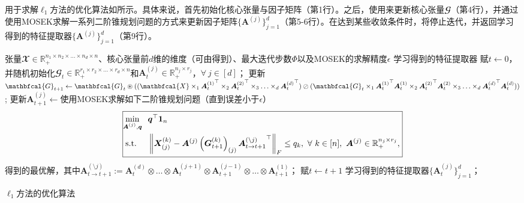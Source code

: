 用于求解$\ell_1$方法的优化算法如所示。具体来说，首先初始化核心张量与因子矩阵（第1行）。之后，使用来更新核心张量$\mathbfcal{G}$（第4行），并通过使用MOSEK求解一系列二阶锥规划问题的方式来更新因子矩阵$\{\boldsymbol{A}^{(j)}\}_{j=1}^{d}$（第5-6行）。在达到某些收敛条件时，将停止迭代，并返回学习得到的特征提取器$\{\boldsymbol{A}^{(j)}\}_{j=1}^{d}$（第9行）。

\begin{algorithm}[t]
	\begin{algorithmic}[1]
	\REQUIRE 张量$\mathbfcal{X} \in \mathbb{R}_{+}^{n_1 \times n_2 \times \ldots \times n_d \times n}$、核心张量前$d$维的维度（可由得到）、最大迭代步数$\Phi$以及MOSEK的求解精度$\epsilon$
	\ENSURE 学习得到的特征提取器
	\STATE 赋$t\leftarrow 0$，并随机初始化$\mathbfcal{G}_{t} \in \mathbb{R}_{+}^{r_1 \times r_2 \times \ldots \times r_d \times n}$和$\boldsymbol{A}^{(j)}_{t}\in \mathbb{R}_{+}^{n_j \times r_j}$，$\forall~ j\in[d]$；\hspace{-2em}
    \STATE 更新$\mathbfcal{G}_{t+1} \leftarrow \mathbfcal{G}_{t} \oast ((\mathbfcal{X} \times_{1} {\boldsymbol{A}_{t}^{(1)}}^{\top} \times_{2} {\boldsymbol{A}_{t}^{(2)}}^{\top} \times_{3} \ldots \times_{d} {\boldsymbol{A}_{t}^{(d)}}^{\top})\oslash
	(\mathbfcal{G}_{t} \times_{1} {\boldsymbol{A}_{t}^{(1)}}^{\top} \boldsymbol{A}_{t}^{(1)} \times_{2} {\boldsymbol{A}_{t}^{(2)}}^{\top} \boldsymbol{A}_{t}^{(2)} \times_{3}  \ldots \times_{d} {\boldsymbol{A}_{t}^{(d)}}^{\top} \boldsymbol{A}_{t}^{(d)}))$;
    \STATE 更新$\boldsymbol{A}_{t+1}^{(j)}\leftarrow$使用MOSEK求解如下二阶锥规划问题（直到误差小于$\epsilon$）
    \begin{equation*}
    \boxed{
        \begin{aligned}
        &\underset{\mathclap{\boldsymbol{A}^{(j)},\boldsymbol{q}}}{\min} && \boldsymbol{q}^{\top}\boldsymbol{1}_{n} \\
        &\text{s.t.} && \left\|\boldsymbol{X}^{(k)}_{(j)}- \boldsymbol{A}^{(j)} \left(\boldsymbol{G}_{t+1}^{(k)}\right)_{(j)} {\boldsymbol{A}_{t\rightarrow t+1}^{(\setminus j)}}^{\top}\right\|_{F} \leq q_{k},~\forall~ k\in[n],~\boldsymbol{A}^{(j)} \in \mathbb{R}_{+}^{n_j \times r_j},
        \end{aligned}
    }
    \end{equation*}
    得到的最优解，其中$\boldsymbol{A}_{t\rightarrow t+1}^{(\setminus j)} := \boldsymbol{A}_{t}^{(d)} \otimes \ldots \otimes \boldsymbol{A}_{t}^{(j+1)} \otimes \boldsymbol{A}_{t+1}^{(j-1)} \otimes \ldots \otimes \boldsymbol{A}_{t+1}^{(1)}$；
    \ENDFOR
    \STATE 赋$t\leftarrow t+1$
    \ENDWHILE
	\RETURN 学习得到的特征提取器$\{\boldsymbol{A}_{t}^{(j)}\}_{j=1}^{d}$；
	\end{algorithmic}
	\captionsetup{labelsep=period,font=bf}
	\caption{$\ell_1$方法的优化算法}
	\label{alg:l1}
\end{algorithm}



